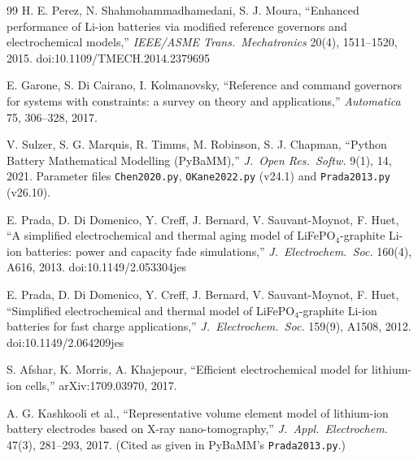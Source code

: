 \documentclass[11pt]{article}
\newcommand{\code}[1]{\texttt{#1}}
\begin{document}
\begin{thebibliography}{99}
 H. E. Perez, N. Shahmohammadhamedani, S. J. Moura, ``Enhanced performance of Li-ion batteries via modified reference governors and electrochemical models,'' \emph{IEEE/ASME Trans.\ Mechatronics} 20(4), 1511--1520, 2015. doi:10.1109/TMECH.2014.2379695

 E. Garone, S. Di Cairano, I. Kolmanovsky, ``Reference and command governors for systems with constraints: a survey on theory and applications,'' \emph{Automatica} 75, 306--328, 2017.

 V. Sulzer, S. G. Marquis, R. Timms, M. Robinson, S. J. Chapman, ``Python Battery Mathematical Modelling (PyBaMM),'' \emph{J.\ Open Res.\ Softw.} 9(1), 14, 2021. Parameter files \code{Chen2020.py}, \code{OKane2022.py} (v24.1) and \code{Prada2013.py} (v26.10).

 E. Prada, D. Di Domenico, Y. Creff, J. Bernard, V. Sauvant-Moynot, F. Huet, ``A simplified electrochemical and thermal aging model of LiFePO$_4$-graphite Li-ion batteries: power and capacity fade simulations,'' \emph{J.\ Electrochem.\ Soc.} 160(4), A616, 2013. doi:10.1149/2.053304jes

 E. Prada, D. Di Domenico, Y. Creff, J. Bernard, V. Sauvant-Moynot, F. Huet, ``Simplified electrochemical and thermal model of LiFePO$_4$-graphite Li-ion batteries for fast charge applications,'' \emph{J.\ Electrochem.\ Soc.} 159(9), A1508, 2012. doi:10.1149/2.064209jes

 S. Afshar, K. Morris, A. Khajepour, ``Efficient electrochemical model for lithium-ion cells,'' arXiv:1709.03970, 2017.

 A. G. Kashkooli et al., ``Representative volume element model of lithium-ion battery electrodes based on X-ray nano-tomography,'' \emph{J.\ Appl.\ Electrochem.} 47(3), 281--293, 2017. (Cited as given in PyBaMM's \code{Prada2013.py}.)

\end{thebibliography}
\end{document}
